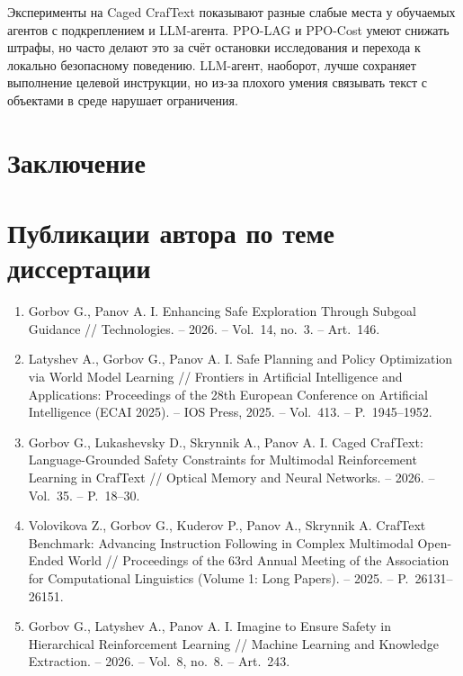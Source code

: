 Эксперименты на Caged CrafText показывают разные слабые места у обучаемых агентов с подкреплением и LLM-агента. PPO-LAG и PPO-Cost умеют снижать штрафы, но часто делают это за счёт остановки исследования и перехода к локально безопасному поведению. LLM-агент, наоборот, лучше сохраняет выполнение целевой инструкции, но из-за плохого умения связывать текст с объектами в среде нарушает ограничения.

\FloatBarrier
{}
\section*{Заключение}



\section*{Публикации автора по теме диссертации}

\begin{enumerate}
  \item Gorbov G., Panov A. I. Enhancing Safe Exploration Through Subgoal Guidance // Technologies. -- 2026. -- Vol.~14, no.~3. -- Art.~146.

  \item Latyshev A., Gorbov G., Panov A. I. Safe Planning and Policy Optimization via World Model Learning // Frontiers in Artificial Intelligence and Applications: Proceedings of the 28th European Conference on Artificial Intelligence (ECAI 2025). -- IOS Press, 2025. -- Vol.~413. -- P.~1945--1952.

  \item Gorbov G., Lukashevsky D., Skrynnik A., Panov A. I. Caged CrafText: Language-Grounded Safety Constraints for Multimodal Reinforcement Learning in CrafText // Optical Memory and Neural Networks. -- 2026. -- Vol.~35. -- P.~18--30.

  \item Volovikova Z., Gorbov G., Kuderov P., Panov A., Skrynnik A. CrafText Benchmark: Advancing Instruction Following in Complex Multimodal Open-Ended World // Proceedings of the 63rd Annual Meeting of the Association for Computational Linguistics (Volume 1: Long Papers). -- 2025. -- P.~26131--26151.

  \item Gorbov G., Latyshev A., Panov A. I. Imagine to Ensure Safety in Hierarchical Reinforcement Learning // Machine Learning and Knowledge Extraction. -- 2026. -- Vol.~8, no.~8. -- Art.~243.
\end{enumerate}
